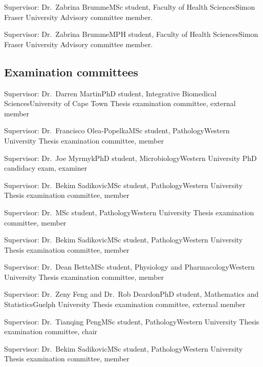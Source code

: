 {Supervisor: Dr.~Zabrina Brumme}{MSc student, Faculty of Health Sciences}{Simon Fraser University}
{Advisory committee member.}

{Supervisor: Dr.~Zabrina Brumme}{MPH student, Faculty of Health Sciences}{Simon Fraser University}
{Advisory committee member.}



\subsection {Examination committees} 

{Supervisor: Dr.~Darren Martin}{PhD student, Integrative Biomedical Sciences}{University of Cape Town}
{Thesis examination committee, external member}

{Supervisor: Dr.~Francisco Olea-Popelka}{MSc student, Pathology}{Western University}
{Thesis examination committee, member}

{Supervisor: Dr.~Joe Myrmyk}{PhD student, Microbiology}{Western University}
{PhD candidacy exam, examiner}


{Supervisor: Dr.~Bekim Sadikovic}{MSc student, Pathology}{Western University}
{Thesis examination committee, member}

{Supervisor: Dr.~}{MSc student, Pathology}{Western University}
{Thesis examination committee, member}


{Supervisor: Dr.~Bekim Sadikovic}{MSc student, Pathology}{Western University}
{Thesis examination committee, member}

{Supervisor: Dr.~Dean Betts}{MSc student, Physiology and Pharmacology}{Western University}
{Thesis examination committee, member}


{Supervisor: Dr.~Zeny Feng and Dr.~Rob Deardon}{PhD student, Mathematics and Statistics}{Guelph University}
{Thesis examination committee, external member}

{Supervisor: Dr.~Tianqing Peng}{MSc student, Pathology}{Western University}
{Thesis examination committee, chair}


{Supervisor: Dr.~Bekim Sadikovic}{MSc student, Pathology}{Western University}
{Thesis examination committee, member}


